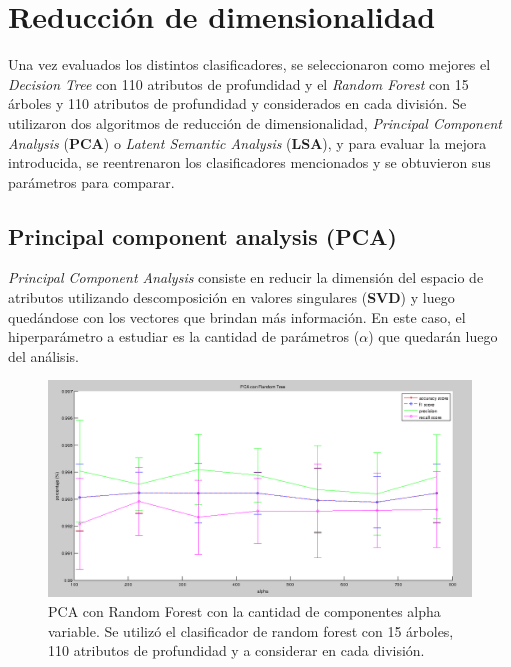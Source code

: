 \documentclass{article}
\begin{document}
\section{Reducción de dimensionalidad}

Una vez evaluados los distintos clasificadores, se seleccionaron como mejores el \textit{Decision Tree} con 110 atributos de profundidad y el \textit{Random Forest} con 15 árboles y 110 atributos de profundidad y considerados en cada división. Se utilizaron dos algoritmos de reducción de dimensionalidad, \textit{Principal Component Analysis} (\textbf{PCA}) o \textit{Latent Semantic Analysis} (\textbf{LSA}), y para evaluar la mejora introducida, se reentrenaron los clasificadores mencionados y se obtuvieron sus parámetros para comparar.

\subsection{Principal component analysis (PCA)}

\textit{Principal Component Analysis} consiste en reducir la dimensión del espacio de atributos utilizando descomposición en valores singulares (\textbf{SVD}) y luego quedándose con los vectores que brindan más información. En este caso, el hiperparámetro a estudiar es la cantidad de parámetros ($\alpha$) que quedarán luego del análisis.



\begin{figure}[H] %
\begin{center}
\includegraphics[width=500pt]{pcaRandomTree.png}
\caption{PCA con Random Forest con la cantidad de componentes alpha variable. Se utilizó el clasificador de random forest con 15 árboles, 110 atributos de profundidad y a considerar en cada división.}
\label{pcaRandomTree}
\end{center}
\end{figure}
\end{document}
